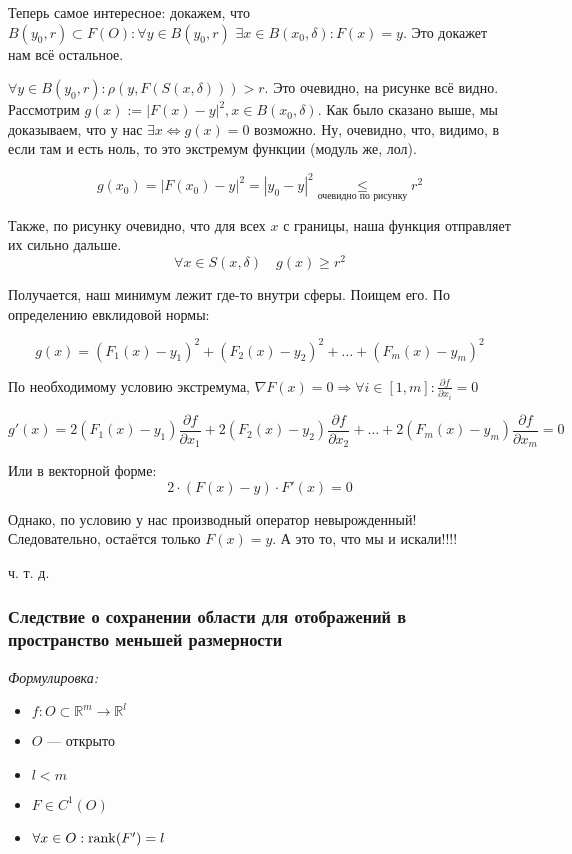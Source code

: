 \documentclass{article}
\def\dbl{\,\,}
\begin{document}
Теперь самое интересное: докажем, что $B(y_0, r) \subset F(O): \forall y \in B(y_0, r) \dbl \exists x \in B(x_0, \delta): F(x) = y$. Это докажет нам всё остальное.

$\forall y \in B(y_0, r): \rho(y, F(S(x, \delta))) > r$. Это очевидно, на рисунке всё видно. Рассмотрим $g(x) := |F(x) - y|^2, x \in B(x_0, \delta)$. Как было сказано выше, мы доказываем, что у нас $\exists x \Leftrightarrow g(x) = 0$ возможно. Ну, очевидно, что, видимо, в если там и есть ноль, то это экстремум функции (модуль же, лол).

\[g(x_0) = |F(x_0) - y|^2 = |y_0 - y|^2 \underset{\text{очевидно по рисунку}}{\le} r^2\]

Также, по рисунку очевидно, что для всех $x$ с границы, наша функция отправляет их сильно дальше.
\[\forall x \in S(x, \delta) \quad g(x) \ge r^2\]

Получается, наш минимум лежит где-то внутри сферы. Поищем его. По определению евклидовой нормы:

\[g(x) = (F_1(x) - y_1)^2 + (F_2(x) - y_2)^2 + \ldots + (F_m(x) - y_m)^2\]

По необходимому условию экстремума, $\nabla F(x) = 0 \Rightarrow \forall i \in [1, m]: \frac{\partial f}{\partial x_i} = 0$

\[g'(x) = 2(F_1(x) - y_1)\frac{\partial f}{\partial x_1} + 2(F_2(x) - y_2)\frac{\partial f}{\partial x_2} + \ldots + 2(F_m(x) - y_m)\frac{\partial f}{\partial x_m} = 0\]

Или в векторной форме:
\[2 \cdot (F(x) - y) \cdot F'(x) = 0\]

Однако, по условию у нас производный оператор невырожденный! Следовательно, остаётся только $F(x) = y$. А это то, что мы и искали!!!!

ч. т. д.


\subsubsection{Следствие о сохранении области для отображений в пространство меньшей размерности}
\textit{Формулировка:}

\begin{itemize}
    \item $f: O \subset \mathbb{R}^m \rightarrow \mathbb{R}^l$
    \item $O$ --- открыто
    \item $l < m$    
    \item $F \in C^1(O)$
    \item $\forall x \in O: \rank(F') = l$
\end{itemize}
\end{document}
